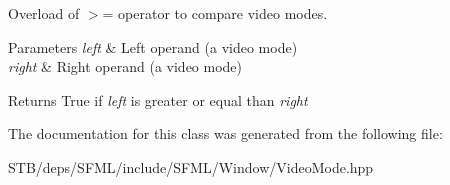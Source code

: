 Overload of $>$= operator to compare video modes. 


\begin{DoxyParams}{Parameters}
{\em left} & Left operand (a video mode) \\
\hline
{\em right} & Right operand (a video mode)\\
\hline
\end{DoxyParams}
\begin{DoxyReturn}{Returns}
True if {\itshape left} is greater or equal than {\itshape right} 
\end{DoxyReturn}


The documentation for this class was generated from the following file\+:\begin{DoxyCompactItemize}
\item 
S\+T\+B/deps/\+S\+F\+M\+L/include/\+S\+F\+M\+L/\+Window/Video\+Mode.\+hpp\end{DoxyCompactItemize}
